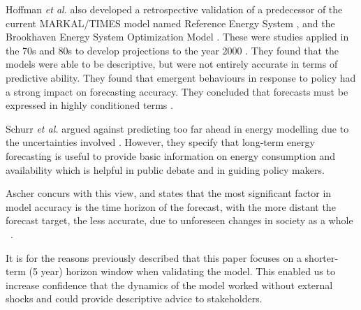 \documentclass[final,3p,times,twocolumn,numbers]{elsarticle}
\begin{document}
Hoffman \textit{et al.} also developed a retrospective validation of a predecessor of the current MARKAL\slash TIMES model named Reference Energy System \cite{Hoffman_1973}, and the Brookhaven Energy System Optimization Model \cite{ERDA_48}. These were studies applied in the 70s and 80s to develop projections to the year 2000 . They found that the models were able to be descriptive, but were not entirely accurate in terms of predictive ability. They found that emergent behaviours in response to policy had a strong impact on forecasting accuracy. They concluded that forecasts must be expressed in highly conditioned terms \cite{Hoffman2011}. 

Schurr \textit{et al.} argued against predicting too far ahead in energy modelling due to the uncertainties involved \cite{Schurr_1961}. However, they specify that long-term energy forecasting is useful to provide basic information on energy consumption and availability which is helpful in public debate and in guiding policy makers.


Ascher concurs with this view, and states that the most significant factor in model accuracy is the time horizon of the forecast, with the more distant the forecast target, the less accurate, due to unforeseen changes in society as a whole ~\cite{gillespie_1979}.

It is for the reasons previously described that this paper focuses on a shorter-term (5 year) horizon window when validating the model. This enabled us to increase confidence that the dynamics of the model worked without external shocks and could provide descriptive advice to stakeholders.


\end{document}
